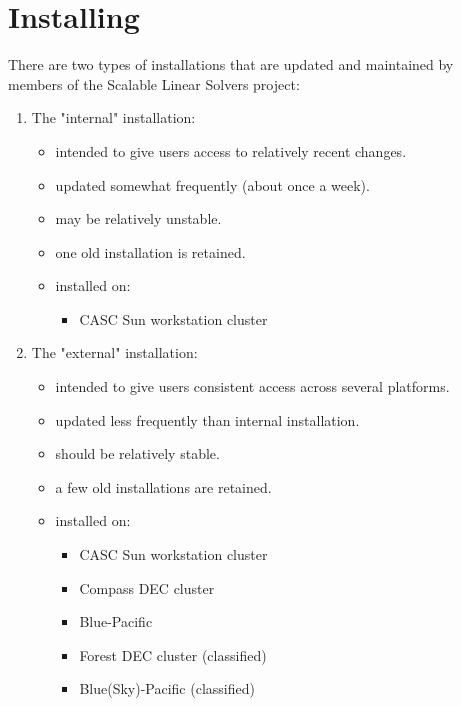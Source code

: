 \chapter{Installing \hypre{}}
\label{Installing hypre}

There are two types of \hypre{} installations that are updated and
maintained by members of the Scalable Linear Solvers project:
\begin{enumerate}

\item The "internal" installation:
   \begin{itemize}
   \item intended to give users access to relatively recent changes.
   \item updated somewhat frequently (about once a week).
   \item may be relatively unstable.
   \item one old installation is retained.
   \item installed on:
      \begin{itemize}
      \item CASC Sun workstation cluster
      \end{itemize}
   \end{itemize}

\item The "external" installation:
   \begin{itemize}
   \item intended to give users consistent access across several platforms.
   \item updated less frequently than internal installation.
   \item should be relatively stable.
   \item a few old installations are retained.
   \item installed on:
      \begin{itemize}
       \item CASC Sun workstation cluster
       \item Compass DEC cluster
       \item Blue-Pacific
       \item Forest DEC cluster  (classified)
       \item Blue(Sky)-Pacific   (classified)
      \end{itemize}
   \end{itemize}

\end{enumerate}

